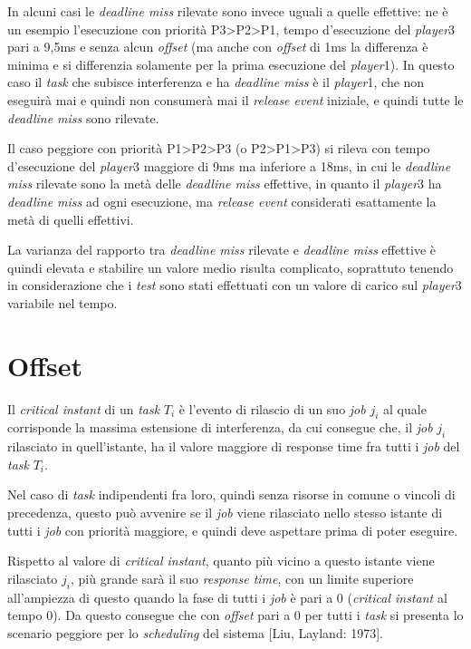 \documentclass{article}
\begin{document}
In alcuni casi le \textit{deadline miss} rilevate sono invece uguali a quelle effettive: ne è un esempio l'esecuzione con priorità P3>P2>P1,  tempo d'esecuzione del \textit{player}3 pari a 9,5ms e senza alcun \textit{offset} (ma anche con \textit{offset} di 1ms la differenza è minima e si differenzia solamente per la prima esecuzione del \textit{player}1). In questo caso il \textit{task} che subisce interferenza e ha \textit{deadline miss} è il \textit{player}1, che non eseguirà mai e quindi non consumerà mai il \textit{release event} iniziale, e quindi tutte le \textit{deadline miss} sono rilevate.

Il caso peggiore con priorità P1>P2>P3 (o P2>P1>P3) si rileva con tempo d'esecuzione del \textit{player}3 maggiore di 9ms ma inferiore a 18ms, in cui le \textit{deadline miss} rilevate sono la metà delle \textit{deadline miss} effettive, in quanto il \textit{player}3 ha \textit{deadline miss} ad ogni esecuzione, ma \textit{release event} considerati esattamente la metà di quelli effettivi.

La varianza del rapporto tra \textit{deadline miss} rilevate e \textit{deadline miss} effettive è quindi elevata e stabilire un valore medio risulta complicato, soprattuto tenendo in considerazione che i \textit{test} sono stati effettuati con un valore di carico sul \textit{player}3 variabile nel tempo.

\section{Offset}

Il \textit{critical instant} di un \textit{task} $T_i$ è l'evento di rilascio di un suo \textit{job} $j_i$ al quale corrisponde la massima estensione di interferenza, da cui consegue che, il \textit{job} $j_i$ rilasciato in quell'istante, ha il valore maggiore di response time fra tutti i \textit{job} del \textit{task} $T_i$.

Nel caso di \textit{task} indipendenti fra loro, quindi senza risorse in comune o vincoli di precedenza, questo può avvenire se il \textit{job} viene rilasciato nello stesso istante di tutti i \textit{job} con priorità maggiore, e quindi deve aspettare prima di poter eseguire.

Rispetto al valore di \textit{critical instant}, quanto più vicino a questo istante viene rilasciato $j_i$, più grande sarà il suo \textit{response time}, con un limite superiore all'ampiezza di questo quando la fase di tutti i \textit{job} è pari a 0 (\textit{critical instant} al tempo 0).
Da questo consegue che con \textit{offset} pari a 0 per tutti i \textit{task} si presenta lo scenario peggiore per lo \textit{scheduling} del sistema [Liu, Layland: 1973].
\end{document}
